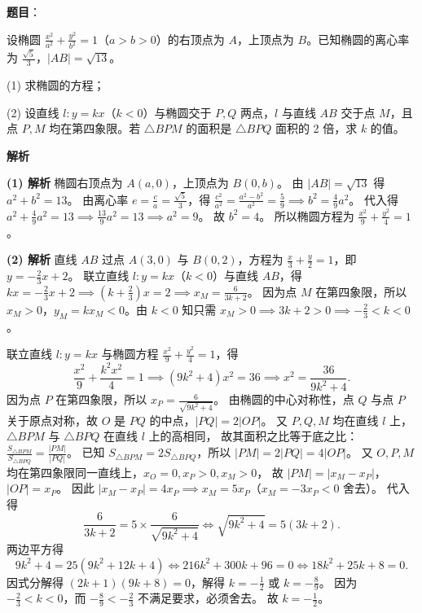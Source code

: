 \begin{answer}

\textbf{题目}：

设椭圆 $\frac{x^2}{a^2}+\frac{y^2}{b^2}=1$（$a>b>0$）的右顶点为 $A$，上顶点为 $B$。已知椭圆的离心率为 $\frac{\sqrt5}{3}$，$|AB|=\sqrt{13}$。

(1) 求椭圆的方程；

(2) 设直线 $l:y=kx$（$k<0$）与椭圆交于 $P,Q$ 两点，$l$ 与直线 $AB$ 交于点 $M$，且点 $P,M$ 均在第四象限。若 $\triangle BPM$ 的面积是 $\triangle BPQ$ 面积的 2 倍，求 $k$ 的值。

\textbf{解析}

\textbf{(1) 解析} 椭圆右顶点为 $A(a,0)$，上顶点为 $B(0,b)$。
由 $|AB|=\sqrt{13}$ 得 $a^2+b^2=13$。
由离心率 $e=\frac ca=\frac{\sqrt5}{3}$，得 $\frac{c^2}{a^2}=\frac{a^2-b^2}{a^2}=\frac59\implies b^2=\frac49 a^2$。
代入得 $a^2+\frac49 a^2=13\implies\frac{13}{9}a^2=13\implies a^2=9$。
故 $b^2=4$。
所以椭圆方程为 $\frac{x^2}{9}+\frac{y^2}{4}=1$。

\textbf{(2) 解析} 直线 $AB$ 过点 $A(3,0)$ 与 $B(0,2)$，方程为 $\frac x3+\frac y2=1$，即 $y=-\frac23 x+2$。
联立直线 $l:y=kx$（$k<0$）与直线 $AB$，得 $kx=-\frac23 x+2\implies\left(k+\frac23\right)x=2\implies x_M=\frac{6}{3k+2}$。
因为点 $M$ 在第四象限，所以 $x_M>0$，$y_M=kx_M<0$。由 $k<0$ 知只需 $x_M>0\implies 3k+2>0\implies -\frac23<k<0$。

联立直线 $l:y=kx$ 与椭圆方程 $\frac{x^2}{9}+\frac{y^2}{4}=1$，得
\nopagebreak[4]
\[\frac{x^2}{9}+\frac{k^2 x^2}{4}=1\implies(9k^2+4)x^2=36\implies x^2=\frac{36}{9k^2+4}.\]
因为点 $P$ 在第四象限，所以 $x_P=\frac{6}{\sqrt{9k^2+4}}$。
由椭圆的中心对称性，点 $Q$ 与点 $P$ 关于原点对称，故 $O$ 是 $PQ$ 的中点，$|PQ|=2|OP|$。
又 $P,Q,M$ 均在直线 $l$ 上，$\triangle BPM$ 与 $\triangle BPQ$ 在直线 $l$ 上的高相同，
故其面积之比等于底之比：$\frac{S_{\triangle BPM}}{S_{\triangle BPQ}}=\frac{|PM|}{|PQ|}$。
已知 $S_{\triangle BPM}=2S_{\triangle BPQ}$，所以 $|PM|=2|PQ|=4|OP|$。
又 $O,P,M$ 均在第四象限同一直线上，$x_O=0,x_P>0,x_M>0$，
故 $|PM|=|x_M-x_P|$，$|OP|=x_P$。
因此 $|x_M-x_P|=4x_P\implies x_M=5x_P$（$x_M=-3x_P<0$ 舍去）。
代入得
\nopagebreak[4]
\[\frac{6}{3k+2}=5\times\frac{6}{\sqrt{9k^2+4}}\iff\sqrt{9k^2+4}=5(3k+2).\]
两边平方得
\nopagebreak[4]
\[9k^2+4=25(9k^2+12k+4)\iff 216k^2+300k+96=0\iff 18k^2+25k+8=0.\]
因式分解得 $(2k+1)(9k+8)=0$，解得 $k=-\frac12$ 或 $k=-\frac89$。
因为 $-\frac23<k<0$，而 $-\frac89<-\frac23$ 不满足要求，必须舍去。
故 $k=-\frac12$。



\end{answer}
